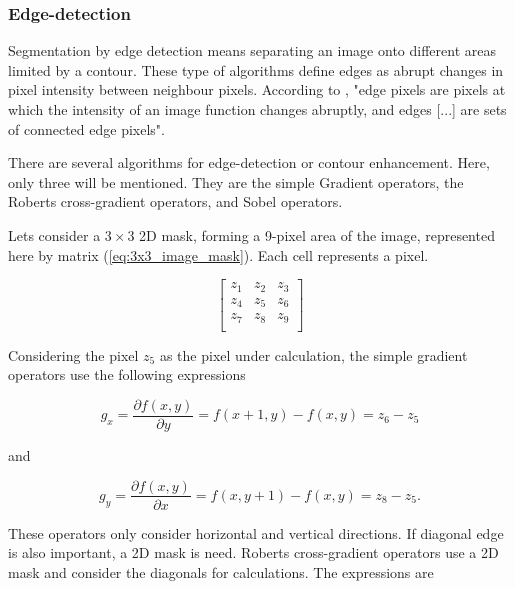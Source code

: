 
\subsubsection*{Edge-detection}
\label{subsubsec:image_segmentation_edge_detection}

Segmentation by edge detection means separating an image onto different areas limited by a contour. These type of algorithms define edges as abrupt changes in pixel intensity between neighbour pixels. According to \cite{Gonzalez2008_digital_image_processing}, "edge pixels are pixels at which the intensity of an image function changes abruptly, and edges [...] are sets of connected edge pixels".

There are several algorithms for edge-detection or contour enhancement. Here, only three will be mentioned. They are the simple Gradient operators, the Roberts cross-gradient operators, and Sobel operators.

Lets consider a $3\times 3$ 2D mask, forming a 9-pixel area of the image, represented here by matrix (\ref{eq:3x3_image_mask}). Each cell represents a pixel.

\begin{equation}
    \label{eq:3x3_image_mask}
    \begin{bmatrix}
        z_1 & z_2 & z_3 \\
        z_4 & z_5 & z_6 \\
        z_7 & z_8 & z_9 \\
    \end{bmatrix}
\end{equation}

Considering the pixel $z_5$ as the pixel under calculation, the simple gradient operators use the following expressions \cite{Gonzalez2008_digital_image_processing}

\begin{equation}
    \label{eq:gradient_operators_x}
    g_x = \frac{\partial f(x,y)}{\partial y} = f(x+1,y)-f(x,y) = z_6 - z_5
\end{equation}

and

\begin{equation}
    \label{eq:gradient_operators_y}
    g_y = \frac{\partial f(x,y)}{\partial x} = f(x,y+1)-f(x,y) = z_8 - z_5.
\end{equation}

These operators only consider horizontal and vertical directions. If diagonal edge is also important, a 2D mask is need. Roberts cross-gradient operators use a 2D mask and consider the diagonals for calculations. The expressions are \cite{Gonzalez2008_digital_image_processing}

